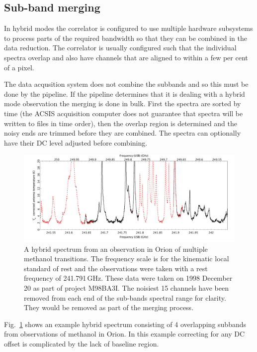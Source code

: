 \documentclass[final,authoryear,5p,times,twocolumn]{elsarticle}
\begin{document}
\subsection{Sub-band merging}

In hybrid modes the correlator is configured to use multiple
hardware subsystems to process parts of the required bandwidth so
that they can be combined in the data reduction. The correlator is
usually configured such that the individual spectra overlap and also
have channels that are aligned to within a few per cent of a pixel.

The data acqusition system does not combine the subbands and so this
must be done by the pipeline. If the pipeline determines that it is
dealing with a hybrid mode observation the merging is done in
bulk. First the spectra are sorted by time (the ACSIS acquisition
computer does not guarantee that spectra will be written to files in
time order), then the overlap region is determined and the noisy ends
are trimmed before they are combined. The spectra can optionally have
their DC level adjusted before combining.

\begin{figure}
\begin{minipage}{\textwidth}
\includegraphics[width=\textwidth]{hybrid}
\caption{A hybrid spectrum from an observation in Orion of multiple
  methanol transitions. The frequency scale is for the kinematic local
  standard of rest and the observations were taken with a rest
  frequency of 241.791\,GHz. These data were taken on 1998 December 20
  as part of project M98BA3I. The noisiest 15 channels have been
  removed from each end of the sub-bands spectral range for
  clarity. They would be removed as part of the merging process.}
\label{fig:hybrid}
\end{minipage}
\end{figure}

Fig.\ \ref{fig:hybrid} shows an example hybrid spectrum consisting of
4 overlapping subbands from observations of methanol in Orion. In this
example correcting for any DC offset is complicated by the lack of
baseline region.
\end{document}
